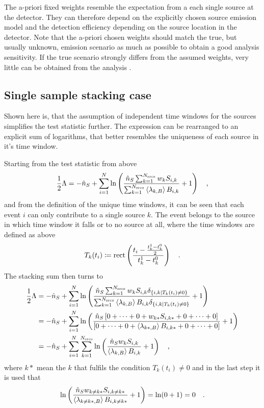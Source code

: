 The a-priori fixed weights resemble the expectation from a each single source at the detector.
They can therefore depend on the explicitly chosen source emission model and the detection efficiency depending on the source location in the detector.
Note that the a-priori chosen weights should match the true, but usually unknown, emission scenario as much as possible to obtain a good analysis sensitivity.
If the true scenario strongly differs from the assumed weights, very little can be obtained from the analysis .


\subsection{Single sample stacking case}
Shown here is, that the assumption of independent time windows for the sources simplifies the test statistic further.
The expression can be rearranged to an explicit sum of logarithms, that better resembles the uniqueness of each source in it's time window.

Starting from the test statistic from above
\begin{equation}
  \frac{1}{2}\Lambda
  = -\hat{n}_S +
    \sum_{i=1}^N \ln\left(
      \frac{\hat{n}_S \sum_{k=1}^{N_\text{srcs}} w_k S_{i,k}}
           {\sum_{k=1}^{N_\text{srcs}}\Braket{\lambda_{k,B}} B_{i,k}}
      + 1 \right)
  \quad\text{,}
\end{equation}
and from the definition of the unique time windows, it can be seen that each event $i$ can only contribute to a single source $k$.
The event belongs to the source in which time window it falls or to no source at all, where the time windows are defined as above
\begin{equation}
  T_k(t_i) \coloneqq \operatorname{rect} \left(
    \frac{t_i - \frac{t_k^1-t_k^0}{2}} {t_k^1-t_k^0}
  \right)
  \quad\text{.}
\end{equation}
The stacking sum then turns to
\begin{align}
  \frac{1}{2}\Lambda
  &= -\hat{n}_S +
    \sum_{i=1}^N \ln\left(
      \frac{\hat{n}_S \sum_{k=1}^{N_\text{srcs}} w_k S_{i,k}
            \delta_{\{i,k|T_k(t_i)\neq 0\}}}
           {\sum_{k=1}^{N_\text{srcs}}\Braket{\lambda_{k,B}} B_{i,k}
            \delta_{\{i,k|T_k(t_i)\neq 0\}}}
      + 1 \right) \\
  &= -\hat{n}_S +
    \sum_{i=1}^N \ln\left(
      \frac{\hat{n}_S \left[0+\dots+0+ w_{k*} S_{i,k*} +0+\dots+0\right]}
           {\left[0+\dots+0+ \Braket{\lambda_{k*,B}} B_{i,k*} +0+\dots+0\right]}
      + 1 \right) \\
  &= -\hat{n}_S +
    \sum_{i=1}^N \sum_{k=1}^{N_\text{srcs}} \ln\left(
      \frac{\hat{n}_S w_k S_{i,k}}{\Braket{\lambda_{k,B}} B_{i,k}}
      + 1 \right) \quad\text{,}
\end{align}
where $k*$ mean the $k$ that fulfils the condition $T_k(t_i)\neq 0$ and in the last step it is used that
\begin{equation}
   \ln\left(
      \frac{\hat{n}_S w_{k\neq k*} S_{i,k\neq k*}}{\Braket{\lambda_{k\neq k*,B}} B_{i,k\neq k*}}
      + 1 \right) = \ln(0 + 1) = 0
      \quad\text{.}
\end{equation}

